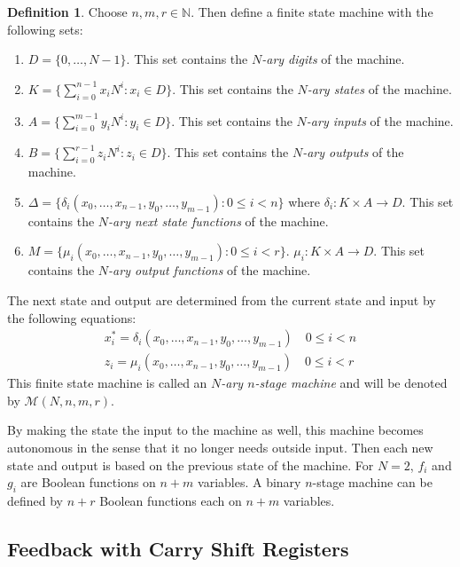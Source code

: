 \documentclass[english]{article}
\def\nnn{\mathbb{N}}
\theoremstyle{plain}
\theoremstyle{definition}
\newtheorem{definition}[theorem]{Definition}%
\theoremstyle{remark}
\begin{document}
\begin{definition}\label{N-ary-n-stage-machine}
  Choose $n,m,r\in\nnn$. Then define a finite state machine with the
  following sets:
  \begin{enumerate}[1.]
    \item $D=\{0,\dots,N-1\}$. This set contains the {\em $N$-ary digits} of the
      machine.
    \item $K=\{\sum_{i=0}^{n-1}x_iN^i:x_i\in D\}$. This set contains the
      {\em $N$-ary states} of the machine.
    \item $A=\{\sum_{i=0}^{m-1}y_iN^i:y_i\in D\}$. This set contains the
      {\em $N$-ary inputs} of the machine.
    \item $B=\{\sum_{i=0}^{r-1}z_iN^i:z_i\in D\}$. This set contains the
      {\em $N$-ary outputs} of the machine.
    \item $\Delta=\{\delta_i(x_0,\dots,x_{n-1},y_0,\dots,y_{m-1}):0\le i<n\}$ where
      $\delta_i:K\times A\rightarrow D$. This set contains the {\em $N$-ary next state functions} of the machine.
    \item $M=\{\mu_i(x_0,\dots,x_{n-1},y_0,\dots,y_{m-1}):0\le i<r\}$.
      $\mu_i:K\times A\rightarrow D$. This set contains the {\em $N$-ary output functions} of the machine.
  \end{enumerate}
  The next state and output are determined from the current state and input by the
  following equations:
  \begin{eqnarray}
    x_i^*=\delta_i(x_0,\dots,x_{n-1},y_0,\dots,y_{m-1}) \quad 0\le i<n \\
    z_i=\mu_i(x_0,\dots,x_{n-1},y_0,\dots,y_{m-1}) \quad 0\le i<r
  \end{eqnarray}
  This finite state machine is called an {\em $N$-ary $n$-stage machine} and
  will be denoted by $\mathcal{M}(N,n,m,r)$.
\end{definition}

\par By making the state the input to the machine as well, this machine
becomes autonomous in the sense that it no longer needs outside input. Then
each new state and output is based on the previous state of the machine. For
$N=2$, $f_i$ and $g_i$ are Boolean functions on $n+m$ variables.
A binary $n$-stage machine can be defined by $n+r$ Boolean functions each
on $n+m$ variables.

\subsection{Feedback with Carry Shift Registers}
\end{document}
